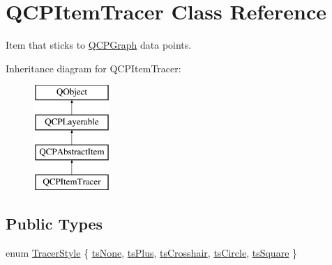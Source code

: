 \hypertarget{class_q_c_p_item_tracer}{}\section{Q\+C\+P\+Item\+Tracer Class Reference}
\label{class_q_c_p_item_tracer}


Item that sticks to \hyperlink{class_q_c_p_graph}{Q\+C\+P\+Graph} data points.  


Inheritance diagram for Q\+C\+P\+Item\+Tracer\+:\begin{figure}[H]
\begin{center}
\leavevmode
\includegraphics[height=4.000000cm]{class_q_c_p_item_tracer}
\end{center}
\end{figure}
\subsection*{Public Types}
\begin{DoxyCompactItemize}
\item 
enum \hyperlink{class_q_c_p_item_tracer_a2f05ddb13978036f902ca3ab47076500}{Tracer\+Style} \{ \newline
\hyperlink{class_q_c_p_item_tracer_a2f05ddb13978036f902ca3ab47076500aac27462c79146225bfa8fba24d2ee8a4}{ts\+None}, 
\hyperlink{class_q_c_p_item_tracer_a2f05ddb13978036f902ca3ab47076500a3323fb04017146e4885e080a459472fa}{ts\+Plus}, 
\hyperlink{class_q_c_p_item_tracer_a2f05ddb13978036f902ca3ab47076500af562ec81ac3ba99e26ef8540cf1ec16f}{ts\+Crosshair}, 
\hyperlink{class_q_c_p_item_tracer_a2f05ddb13978036f902ca3ab47076500ae2252c28f4842880d71e9f94e69de94e}{ts\+Circle}, 
\newline
\hyperlink{class_q_c_p_item_tracer_a2f05ddb13978036f902ca3ab47076500a4ed5f01f2c5fd86d980366d79f481b9b}{ts\+Square}
 \}
\end{DoxyCompactItemize}
